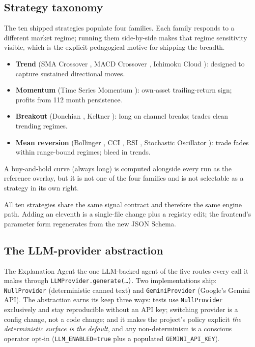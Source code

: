 \subsection{Strategy taxonomy}

The ten shipped strategies populate four families. Each family responds to a
different market regime; running them side-by-side makes that regime sensitivity
visible, which is the explicit pedagogical motive for shipping the breadth.

\begin{itemize}
  \item \textbf{Trend} (SMA Crossover \cite{pardo2008}, MACD Crossover \cite{appel2005},
        Ichimoku Cloud \cite{hosoda1969}): designed to capture sustained directional moves.
  \item \textbf{Momentum} (Time Series Momentum \cite{moskowitz2012}): own-asset trailing-return
        sign; profits from 1\textendash{}12 month persistence.
  \item \textbf{Breakout} (Donchian \cite{faith2007}, Keltner \cite{keltner1960}):
        long on channel breaks; trades clean trending regimes.
  \item \textbf{Mean reversion} (Bollinger \cite{bollinger2001}, CCI \cite{lambert1980},
        RSI \cite{wilder1978}, Stochastic Oscillator \cite{lane1984}): trade fades within
        range-bound regimes; bleed in trends.
\end{itemize}

A buy-and-hold curve (always long) is computed alongside every run as the
reference overlay, but it is not one of the four families and is not selectable
as a strategy in its own right.

All ten strategies share the same signal contract and therefore the same engine
path. Adding an eleventh is a single-file change plus a registry edit; the frontend's
parameter form regenerates from the new JSON Schema.

\subsection{The LLM-provider abstraction}

The Explanation Agent \textemdash{} the one LLM-backed agent of the five
\textemdash{} routes every call it makes through
\texttt{LLMProvider.generate(\ldots)}. Two implementations ship:
\texttt{NullProvider} (deterministic canned text) and \texttt{GeminiProvider}
(Google's Gemini API). The abstraction earns its keep three ways: tests use
\texttt{NullProvider} exclusively and stay reproducible without an API key;
switching provider is a config change, not a code change; and it makes the
project's policy explicit \textemdash{} \emph{the deterministic surface is the
default}, and any non-determinism is a conscious operator opt-in
(\texttt{LLM\_ENABLED=true} plus a populated \texttt{GEMINI\_API\_KEY}).
